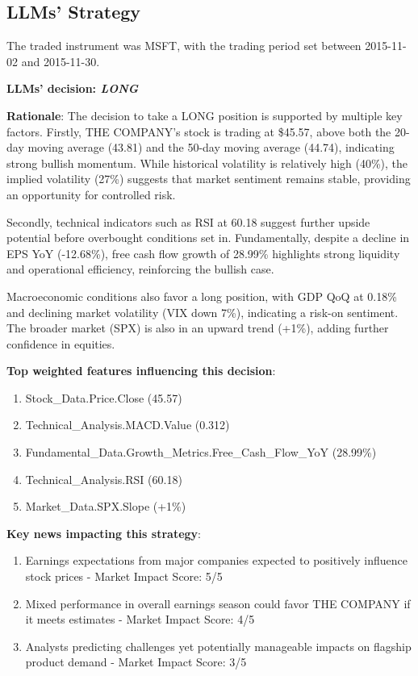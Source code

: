 \documentclass[8pt]{scrartcl}
\begin{document}
\newpage

\subsection*{LLMs' Strategy} \label{strategy6}

The traded instrument was MSFT, with the trading period set between 2015-11-02 and 2015-11-30.

\textbf{LLMs' decision: \textit{LONG}}

\textbf{Rationale}: The decision to take a LONG position is supported by multiple key factors. Firstly, THE COMPANY's stock is trading at \$45.57, above both the 20-day moving average (43.81) and the 50-day moving average (44.74), indicating strong bullish momentum. While historical volatility is relatively high (40\%), the implied volatility (27\%) suggests that market sentiment remains stable, providing an opportunity for controlled risk.

Secondly, technical indicators such as RSI at 60.18 suggest further upside potential before overbought conditions set in. Fundamentally, despite a decline in EPS YoY (-12.68\%), free cash flow growth of 28.99\% highlights strong liquidity and operational efficiency, reinforcing the bullish case.

Macroeconomic conditions also favor a long position, with GDP QoQ at 0.18\% and declining market volatility (VIX down 7\%), indicating a risk-on sentiment. The broader market (SPX) is also in an upward trend (+1\%), adding further confidence in equities.

\textbf{Top weighted features influencing this decision}:
\begin{enumerate}
    \item Stock\_Data.Price.Close (45.57)
    \item Technical\_Analysis.MACD.Value (0.312)
    \item Fundamental\_Data.Growth\_Metrics.Free\_Cash\_Flow\_YoY (28.99\%)
    \item Technical\_Analysis.RSI (60.18)
    \item Market\_Data.SPX.Slope (+1\%)
\end{enumerate}

\textbf{Key news impacting this strategy}:
\begin{enumerate}
    \item Earnings expectations from major companies expected to positively influence stock prices - Market Impact Score: 5/5
    \item Mixed performance in overall earnings season could favor THE COMPANY if it meets estimates - Market Impact Score: 4/5
    \item Analysts predicting challenges yet potentially manageable impacts on flagship product demand - Market Impact Score: 3/5
\end{enumerate}
\end{document}
